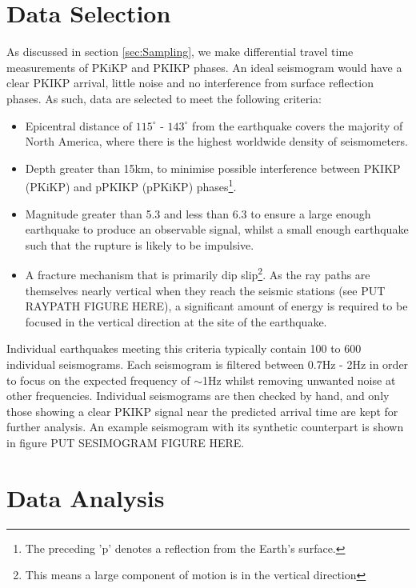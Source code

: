 \documentclass[11pt,a4paper]{article}
\begin{document}
\section{Data Selection}
\label{sec:Data}
As discussed in section \ref{sec:Sampling}, we make differential travel time measurements of PKiKP and PKIKP phases. An ideal seismogram would have a clear PKIKP arrival, little noise and no interference from surface reflection phases. As such, data are selected to meet the following criteria:

\begin{itemize}
	\item Epicentral distance of $115^{\circ}$ - $143^{\circ}$ from the earthquake covers the majority of North America, where there is the highest worldwide density of seismometers.
	\item  Depth greater than 15km, to minimise possible interference between PKIKP (PKiKP) and pPKIKP (pPKiKP) phases\footnote{The preceding 'p' denotes a reflection from the Earth's surface.}.
	\item Magnitude greater than 5.3 and less than 6.3 to ensure a large enough earthquake to produce an observable signal, whilst a small enough earthquake such that the rupture is likely to be impulsive.
	\item A fracture mechanism that is primarily dip slip\footnote{This means a large component of motion is in the vertical direction}. As the ray paths are themselves nearly vertical when they reach the seismic stations (see PUT RAYPATH FIGURE HERE), a significant amount of energy is required to be focused in the vertical direction at the site of the earthquake.
\end{itemize}

Individual earthquakes meeting this criteria typically contain 100 to 600 individual seismograms. Each seismogram is filtered between 0.7Hz - 2Hz in order to focus on the expected frequency of $\sim$1Hz whilst removing unwanted noise at other frequencies. Individual seismograms are then checked by hand, and only those showing a clear PKIKP signal near the predicted arrival time are kept for further analysis. An example seismogram with its synthetic counterpart is shown in figure PUT SESIMOGRAM FIGURE HERE.

\section{Data Analysis}
\end{document}

